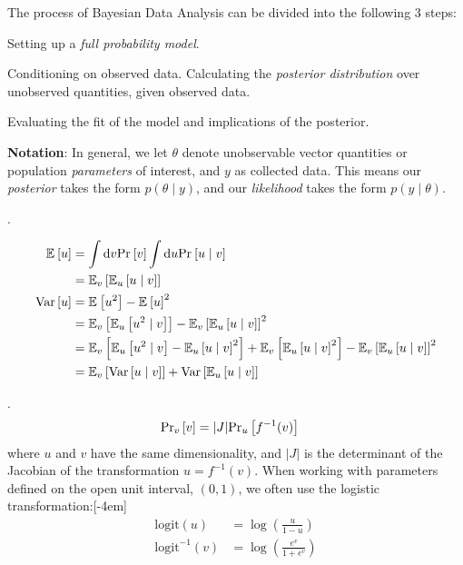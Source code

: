 \documentclass[11pt]{article}
\begin{document}

\p The process of Bayesian Data Analysis can be divided into the following 3 steps:
\begin{compactenum}
	\item Setting up a \textit{full probability model}.
	\item Conditioning on observed data. Calculating the \textit{posterior distribution} over unobserved quantities, given observed data.
	\item Evaluating the fit of the model and implications of the posterior. 
\end{compactenum}
\textbf{Notation}: In general, we let $\theta$ denote unobservable vector quantities or population \textit{parameters} of interest, and $y$ as collected data. This means our \textit{posterior} takes the form $p(\theta \mid y)$, and our \textit{likelihood} takes the form $p(y \mid \theta)$. 

\myspace
\p {}.
\begin{example}[Proofs]
\vspace{-1em}
\begin{align}
	\E{u} 
		&= \int \mathrm{d}v \Prob{v} \int \mathrm{d}u \Prob{u \mid v} \\
		&= \E[v]{\E[u]{u \mid v}} \\
	\Var{u}
		&= \E{u^2} - \E{u}^2 \\
		&= \E[v]{ \E[u]{u^2 \mid v} } - \E[v]{\E[u]{u \mid v}}^2 \\
		&= \E[v]{ \E[u]{u^2 \mid v} - \E[u]{u \mid v}^2 } + \E[v]{\E[u]{u \mid v}^2} - \E[v]{\E[u]{u \mid v}}^2 \\
		&= \E[v]{ \Var{u \mid v} } + \Var{ \E[u]{u \mid v} }
\end{align}
\end{example}

\myspace
\p {}. 
\begin{align}
	\Prob[v]{v} &= |J| \Prob[u]{f^{-1}(v)}
\end{align}
where $u$ and $v$ have the same dimensionality, and $|J|$ is the determinant of the Jacobian of the transformation $u = f^{-1}(v)$. When working with parameters defined on the open unit interval, $(0, 1)$, we often use the logistic transformation:[-4em]
\begin{align}
	\text{logit}(u) &= \log\left(  \frac{u}{1 - u} \right) \\
	\text{logit}^{-1}(v) &= \log\left(  \frac{e^v}{1 + e^{v} } \right) 
\end{align}
\end{document}
